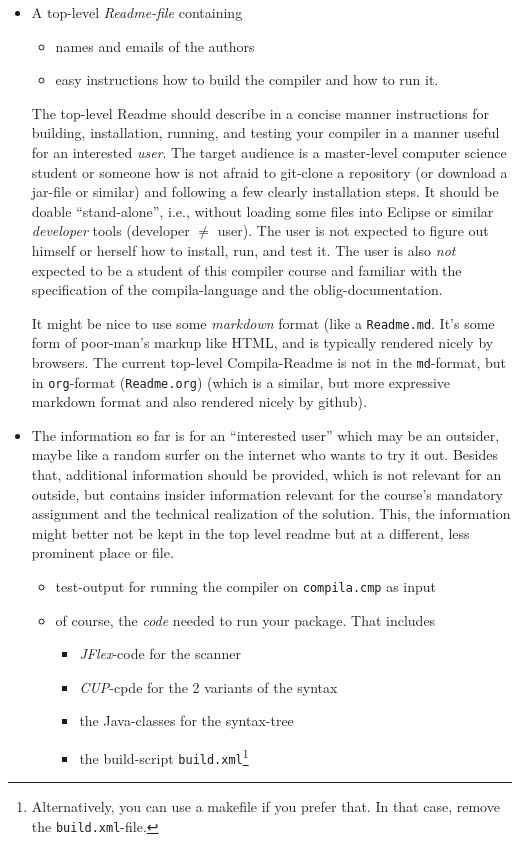 \documentclass[10pt,freeform]{handout}[2014/08/13]
\begin{document}
\begin{itemize}
\item A top-level \emph{Readme-file} containing
  \begin{itemize}
  \item names and emails of the authors
  \item easy instructions how to build the compiler and how to run it.
  \end{itemize}
  The top-level Readme should describe in a concise manner instructions for
  building, installation, running, and testing your compiler in a manner
  useful for an interested \emph{user}. The target audience is a
  master-level computer science student or someone how is not afraid to
  git-clone a repository (or download a jar-file or similar) and following
  a few clearly installation steps. It should be doable ``stand-alone'',
  i.e., without loading some files into Eclipse or similar \emph{developer}
  tools (developer $\not=$ user). The user is not expected to figure out
  himself or herself how to install, run, and test it. The user is also
  \emph{not} expected to be a student of this compiler course and familiar
  with the specification of the compila-language and the
  oblig-documentation.

  It might be nice to use some \emph{markdown} format (like a
  \texttt{Readme.md}. It's some form of poor-man's markup like HTML, and is
  typically rendered nicely by browsers. The current top-level
  Compila-Readme is not in the \texttt{md}-format, but in
  \texttt{org}-format (\texttt{Readme.org}) (which is a similar, but more
  expressive markdown format and also rendered nicely by github).
  
\item The information so far is for an ``interested user'' which may be an
  outsider, maybe like a random surfer on the internet who wants to try it
  out. Besides that, additional information should be provided, which is
  not relevant for an outside, but contains insider information relevant
  for the course's mandatory assignment and the technical realization of
  the solution. This, the information might better not be kept in the top
  level readme but at a different, less prominent place or file.
  \begin{itemize}
  \item test-output for running the compiler on \texttt{compila.cmp} as
    input
  \item of course, the \emph{code} needed to run your package. That
    includes
    \begin{itemize}
    \item \textsl{JFlex}-code for the scanner
    \item \textsl{CUP}-cpde for the 2 variants of the syntax
    \item the Java-classes for the syntax-tree
    \item the build-script \texttt{build.xml}\footnote{Alternatively, you
        can use a makefile if you prefer that. In that case, remove the
        \texttt{build.xml}-file.}
    \end{itemize}
  \end{itemize}
\end{itemize}
\end{document}
